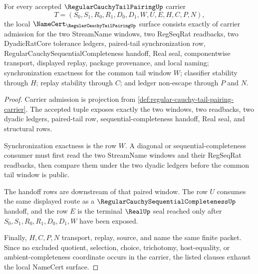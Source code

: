 \begin{theorem}
\label{thm:regular-cauchy-tail-pairing-namecert-obligations}
For every accepted $\RegularCauchyTailPairingUp$ carrier
$$
T=(S_0,S_1,R_0,R_1,D_0,D_1,W,U,E,H,C,P,N),
$$
the local $\NameCert_{\RegularCauchyTailPairingUp}$ surface consists exactly of carrier admission for the two StreamName windows, two RegSeqRat readbacks, two DyadicRatCore tolerance ledgers, paired-tail synchronization row, RegularCauchySequentialCompleteness handoff, Real seal, componentwise transport, displayed replay, package provenance, and local naming; synchronization exactness for the common tail window $W$; classifier stability through $H$; replay stability through $C$; and ledger non-escape through $P$ and $N$.
\end{theorem}
\begin{proof}
Carrier admission is projection from \autoref{def:regular-cauchy-tail-pairing-carrier}. The accepted tuple exposes exactly the two windows, two readbacks, two dyadic ledgers, paired-tail row, sequential-completeness handoff, Real seal, and structural rows.

Synchronization exactness is the row $W$. A diagonal or sequential-completeness consumer must first read the two StreamName windows and their RegSeqRat readbacks, then compare them under the two dyadic ledgers before the common tail window is public.

The handoff rows are downstream of that paired window. The row $U$ consumes the same displayed route as a $\RegularCauchySequentialCompletenessUp$ handoff, and the row $E$ is the terminal $\RealUp$ seal reached only after $S_0,S_1,R_0,R_1,D_0,D_1,W$ have been exposed.

Finally, $H,C,P,N$ transport, replay, source, and name the same finite packet. Since no excluded quotient, selection, choice, trichotomy, host-equality, or ambient-completeness coordinate occurs in the carrier, the listed clauses exhaust the local NameCert surface.
\end{proof}

